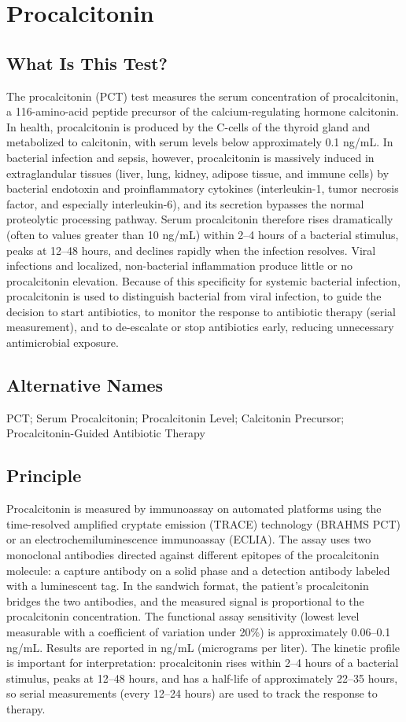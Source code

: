 \chapter{Procalcitonin}

\section*{What Is This Test?}
The procalcitonin (PCT) test measures the serum concentration of procalcitonin, a 116-amino-acid peptide precursor of the calcium-regulating hormone calcitonin. In health, procalcitonin is produced by the C-cells of the thyroid gland and metabolized to calcitonin, with serum levels below approximately 0.1 ng/mL. In bacterial infection and sepsis, however, procalcitonin is massively induced in extraglandular tissues (liver, lung, kidney, adipose tissue, and immune cells) by bacterial endotoxin and proinflammatory cytokines (interleukin-1, tumor necrosis factor, and especially interleukin-6), and its secretion bypasses the normal proteolytic processing pathway. Serum procalcitonin therefore rises dramatically (often to values greater than 10 ng/mL) within 2--4 hours of a bacterial stimulus, peaks at 12--48 hours, and declines rapidly when the infection resolves. Viral infections and localized, non-bacterial inflammation produce little or no procalcitonin elevation. Because of this specificity for systemic bacterial infection, procalcitonin is used to distinguish bacterial from viral infection, to guide the decision to start antibiotics, to monitor the response to antibiotic therapy (serial measurement), and to de-escalate or stop antibiotics early, reducing unnecessary antimicrobial exposure.

\section*{Alternative Names}
PCT; Serum Procalcitonin; Procalcitonin Level; Calcitonin Precursor; Procalcitonin-Guided Antibiotic Therapy

\section*{Principle}
Procalcitonin is measured by immunoassay on automated platforms using the time-resolved amplified cryptate emission (TRACE) technology (BRAHMS PCT) or an electrochemiluminescence immunoassay (ECLIA). The assay uses two monoclonal antibodies directed against different epitopes of the procalcitonin molecule: a capture antibody on a solid phase and a detection antibody labeled with a luminescent tag. In the sandwich format, the patient's procalcitonin bridges the two antibodies, and the measured signal is proportional to the procalcitonin concentration. The functional assay sensitivity (lowest level measurable with a coefficient of variation under 20\%) is approximately 0.06--0.1 ng/mL. Results are reported in ng/mL (micrograms per liter). The kinetic profile is important for interpretation: procalcitonin rises within 2--4 hours of a bacterial stimulus, peaks at 12--48 hours, and has a half-life of approximately 22--35 hours, so serial measurements (every 12--24 hours) are used to track the response to therapy.


